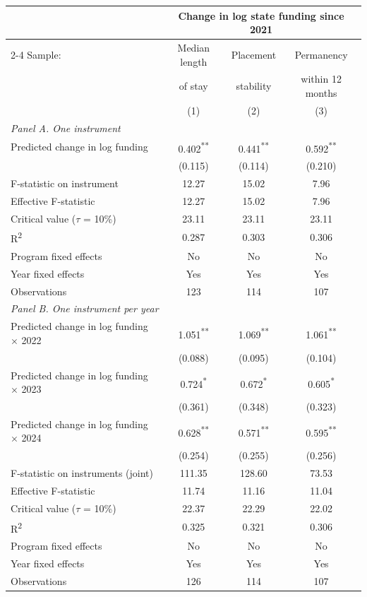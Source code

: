 \begin{table}[htbp]
\centering
\label{tab:iv_first_stage}
\begin{tabular}{l*{3}{c}}
\toprule
 & \multicolumn{3}{c}{Change in log state funding since 2021} \\
\cmidrule(lr){2-4}
Sample: & Median length & Placement & Permanency \\
 & of stay & stability & within 12 months \\
 & (1) & (2) & (3) \\
\midrule
\multicolumn{4}{l}{\textit{Panel A. One instrument}} \\
Predicted change in log funding & 0.402\textsuperscript{**} & 0.441\textsuperscript{**} & 0.592\textsuperscript{**} \\
 & (0.115) & (0.114) & (0.210) \\
F-statistic on instrument & 12.27 & 15.02 & 7.96 \\
Effective F-statistic & 12.27 & 15.02 & 7.96 \\
Critical value (\(\tau\) = 10\%) & 23.11 & 23.11 & 23.11 \\
R\textsuperscript{2} & 0.287 & 0.303 & 0.306 \\
Program fixed effects & No & No & No \\
Year fixed effects & Yes & Yes & Yes \\
Observations & 123 & 114 & 107 \\
\midrule
\multicolumn{4}{l}{\textit{Panel B. One instrument per year}} \\
Predicted change in log funding \(\times\) 2022 & 1.051\textsuperscript{**} & 1.069\textsuperscript{**} & 1.061\textsuperscript{**} \\
 & (0.088) & (0.095) & (0.104) \\
Predicted change in log funding \(\times\) 2023 & 0.724\textsuperscript{*} & 0.672\textsuperscript{*} & 0.605\textsuperscript{*} \\
 & (0.361) & (0.348) & (0.323) \\
Predicted change in log funding \(\times\) 2024 & 0.628\textsuperscript{**} & 0.571\textsuperscript{**} & 0.595\textsuperscript{**} \\
 & (0.254) & (0.255) & (0.256) \\
F-statistic on instruments (joint) & 111.35 & 128.60 & 73.53 \\
Effective F-statistic & 11.74 & 11.16 & 11.04 \\
Critical value (\(\tau\) = 10\%) & 22.37 & 22.29 & 22.02 \\
R\textsuperscript{2} & 0.325 & 0.321 & 0.306 \\
Program fixed effects & No & No & No \\
Year fixed effects & Yes & Yes & Yes \\
Observations & 126 & 114 & 107 \\
\bottomrule
\end{tabular}
\end{table}
